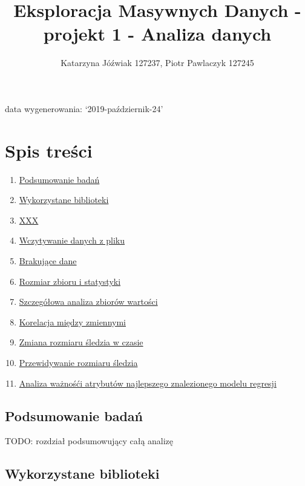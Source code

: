 \documentclass[]{article}
\title{Eksploracja Masywnych Danych - projekt 1 - Analiza danych}
\author{Katarzyna Jóźwiak 127237, Piotr Pawlaczyk 127245}
\date{}
\providecommand{\tightlist}{%
  \setlength{\itemsep}{0pt}\setlength{\parskip}{0pt}}
\begin{document}
\maketitle

data wygenerowania: `2019-październik-24'

\hypertarget{spis-treux15bci}{%
\section{Spis treści}\label{spis-treux15bci}}

\begin{enumerate}
\def\labelenumi{\arabic{enumi}.}
\tightlist
\item
  \protect\hyperlink{summary}{Podsumowanie badań}
\item
  \protect\hyperlink{librarys}{Wykorzystane biblioteki}
\item
  \protect\hyperlink{xxx}{XXX}
\item
  \protect\hyperlink{readDataFromFile}{Wczytywanie danych z pliku}
\item
  \protect\hyperlink{missingData}{Brakujące dane}
\item
  \protect\hyperlink{statistics}{Rozmiar zbioru i statystyki}
\item
  \protect\hyperlink{analisis}{Szczegółowa analiza zbiorów wartości}
\item
  \protect\hyperlink{correlation}{Korelacja między zmiennymi}
\item
  \protect\hyperlink{animation}{Zmiana rozmiaru śledzia w czasie}
\item
  \protect\hyperlink{prediction}{Przewidywanie rozmiaru śledzia}
\item
  \protect\hyperlink{bestModelAnalisis}{Analiza ważnośći atrybutów
  najlepszego znalezionego modelu regresji}
\end{enumerate}

\hypertarget{podsumowanie-badaux144}{%
\subsection{Podsumowanie badań }\label{podsumowanie-badaux144}}

TODO: rozdział podsumowujący całą analizę

\hypertarget{wykorzystane-biblioteki}{%
\subsection{Wykorzystane biblioteki }\label{wykorzystane-biblioteki}}
\end{document}
